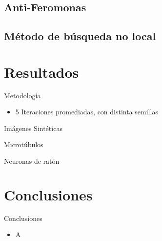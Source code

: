 \documentclass[]{beamer}
\begin{document}
\subsection{Anti-Feromonas}
\subsection{M\'etodo de b\'usqueda no local}

\section{Resultados}
\begin{frame}{Metodolog\'ia}
\begin{itemize}
    \item 5 Iteraciones promediadas, con distinta semillas
\end{itemize}
    
\end{frame}
\begin{frame}{Im\'agenes Sint\'eticas}
    
\end{frame}
\begin{frame}{Microt\'ubulos}
    
\end{frame}

\begin{frame}{Neuronas de rat\'on}

\end{frame}

\section{Conclusiones}
\begin{frame}{Conclusiones}
    \begin{itemize}
        \item A
    \end{itemize}
\end{frame}
\end{document}
